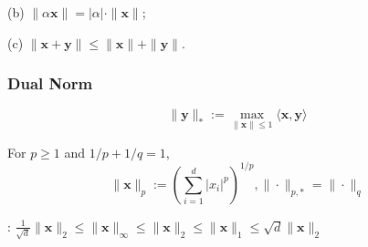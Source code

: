 (b) $\|\alpha \mathbf{x}\|=|\alpha| \cdot\|\mathbf{x}\|$;

(c) $\|\mathbf{x}+\mathbf{y}\| \leq\|\mathbf{x}\|+\|\mathbf{y}\|$.

\subsubsection*{Dual Norm}
$$\|\mathbf{y}\|_{*}:=\max _{\|\mathbf{x}\| \leq 1}\langle\mathbf{x}, \mathbf{y}\rangle$$


For $p \geq 1$ and $1 / p+1 / q=1$,
$$\|\mathbf{x}\|_{p}:=\left(\sum_{i=1}^{d}\left|x_{i}\right|^{p}\right)^{1 / p},\|\cdot\|_{p, *}=\|\cdot\|_{q}$$


: $\frac{1}{\sqrt{d}}\|\mathbf{x}\|_{2} \leq\|\mathbf{x}\|_{\infty} \leq\|\mathbf{x}\|_{2} \leq\|\mathbf{x}\|_{1} \leq \sqrt{d}\|\mathbf{x}\|_{2}$








